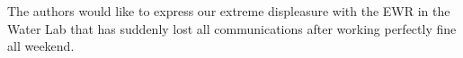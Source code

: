 The authors would like to express our extreme displeasure with the EWR in the Water Lab that has suddenly lost all communications after working perfectly fine all weekend.

